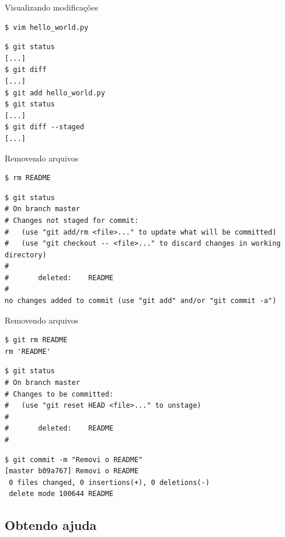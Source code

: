 \documentclass[portuguese,brazil]{beamer}
\begin{document}
\begin{frame}[fragile]{Visualizando modificações}
\begin{verbatim}
$ vim hello_world.py
\end{verbatim}
\pause
\begin{verbatim}
$ git status
[...]
$ git diff
[...]
$ git add hello_world.py
$ git status
[...]
$ git diff --staged
[...]
\end{verbatim}
\end{frame}

\begin{frame}[fragile]{Removendo arquivos}
\begin{verbatim}
$ rm README
\end{verbatim}
\pause
\begin{verbatim}
$ git status
# On branch master
# Changes not staged for commit:
#   (use "git add/rm <file>..." to update what will be committed)
#   (use "git checkout -- <file>..." to discard changes in working directory)
#
#       deleted:    README
#
no changes added to commit (use "git add" and/or "git commit -a")
\end{verbatim}
\end{frame}

\begin{frame}[fragile]{Removendo arquivos}
\begin{verbatim}
$ git rm README
rm 'README'
\end{verbatim}
\pause
\begin{verbatim}
$ git status
# On branch master
# Changes to be committed:
#   (use "git reset HEAD <file>..." to unstage)
#
#       deleted:    README
#
\end{verbatim}
\pause
\begin{verbatim}
$ git commit -m "Removi o README"
[master b09a767] Removi o README
 0 files changed, 0 insertions(+), 0 deletions(-)
 delete mode 100644 README
\end{verbatim}
\end{frame}

\subsection{Obtendo ajuda}
\end{document}
